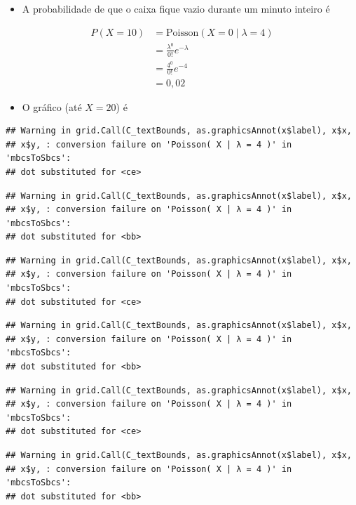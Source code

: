 \documentclass[
  11pt]{report}
\providecommand{\tightlist}{%
  \setlength{\itemsep}{0pt}\setlength{\parskip}{0pt}}
\begin{document}
\begin{itemize}
\tightlist
\item
  A probabilidade de que o caixa fique vazio durante um minuto inteiro é
\end{itemize}

\[
\begin{aligned}
P(X = 10) &= \text{Poisson}(X = 0 \mid \lambda = 4) \\
          &= \frac{\lambda^{0}}{0!}e^{-\lambda} \\
          &= \frac{4^{0}}{0!}e^{-4} \\
          &= 0{,}02
\end{aligned}
\]

\begin{itemize}
\tightlist
\item
  O gráfico (até $X = 20$) é
\end{itemize}

\begin{verbatim}
## Warning in grid.Call(C_textBounds, as.graphicsAnnot(x$label), x$x,
## x$y, : conversion failure on 'Poisson( X | λ = 4 )' in 'mbcsToSbcs':
## dot substituted for <ce>
\end{verbatim}

\begin{verbatim}
## Warning in grid.Call(C_textBounds, as.graphicsAnnot(x$label), x$x,
## x$y, : conversion failure on 'Poisson( X | λ = 4 )' in 'mbcsToSbcs':
## dot substituted for <bb>
\end{verbatim}

\begin{verbatim}
## Warning in grid.Call(C_textBounds, as.graphicsAnnot(x$label), x$x,
## x$y, : conversion failure on 'Poisson( X | λ = 4 )' in 'mbcsToSbcs':
## dot substituted for <ce>
\end{verbatim}

\begin{verbatim}
## Warning in grid.Call(C_textBounds, as.graphicsAnnot(x$label), x$x,
## x$y, : conversion failure on 'Poisson( X | λ = 4 )' in 'mbcsToSbcs':
## dot substituted for <bb>
\end{verbatim}

\begin{verbatim}
## Warning in grid.Call(C_textBounds, as.graphicsAnnot(x$label), x$x,
## x$y, : conversion failure on 'Poisson( X | λ = 4 )' in 'mbcsToSbcs':
## dot substituted for <ce>
\end{verbatim}

\begin{verbatim}
## Warning in grid.Call(C_textBounds, as.graphicsAnnot(x$label), x$x,
## x$y, : conversion failure on 'Poisson( X | λ = 4 )' in 'mbcsToSbcs':
## dot substituted for <bb>
\end{verbatim}
\end{document}
